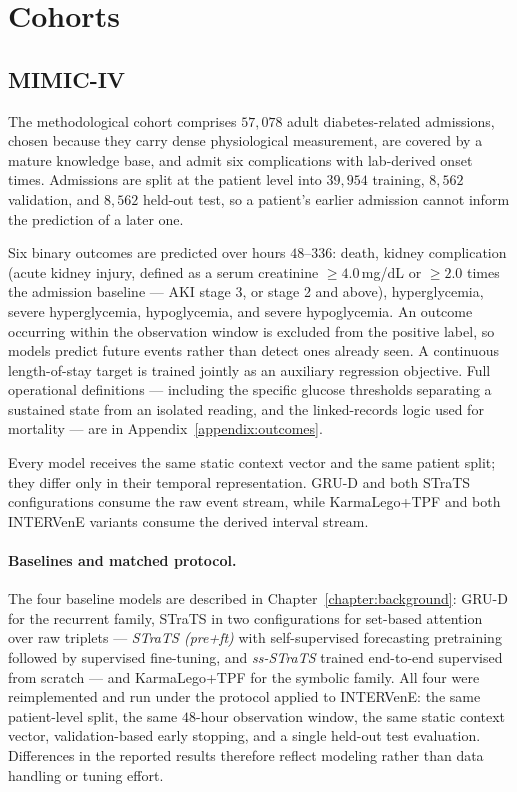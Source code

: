 \section{Cohorts}

\subsection{MIMIC-IV}
\label{sec:evalm-mimic-cohort}

The methodological cohort comprises $57{,}078$ adult diabetes-related admissions, chosen because they carry dense physiological measurement, are covered by a mature knowledge base, and admit six complications with lab-derived onset times. Admissions are split at the patient level into $39{,}954$ training, $8{,}562$ validation, and $8{,}562$ held-out test, so a patient's earlier admission cannot inform the prediction of a later one.

Six binary outcomes are predicted over hours $48$--$336$: death, kidney complication (acute kidney injury, defined as a serum creatinine $\ge 4.0$\,mg/dL or $\ge 2.0$ times the admission baseline --- AKI stage 3, or stage 2 and above), hyperglycemia, severe hyperglycemia, hypoglycemia, and severe hypoglycemia. An outcome occurring within the observation window is excluded from the positive label, so models predict future events rather than detect ones already seen. A continuous length-of-stay target is trained jointly as an auxiliary regression objective. Full operational definitions --- including the specific glucose thresholds separating a sustained state from an isolated reading, and the linked-records logic used for mortality --- are in Appendix~\ref{appendix:outcomes}.

Every model receives the same static context vector and the same patient split; they differ only in their temporal representation. GRU-D and both STraTS configurations consume the raw event stream, while KarmaLego+TPF and both INTERVenE variants consume the derived interval stream.

\paragraph{Baselines and matched protocol.}
The four baseline models are described in Chapter~\ref{chapter:background}: GRU-D \citep{che2018recurrent} for the recurrent family, STraTS \citep{tipirneni2022strats} in two configurations for set-based attention over raw triplets --- \emph{STraTS (pre+ft)} with self-supervised forecasting pretraining followed by supervised fine-tuning, and \emph{ss-STraTS} trained end-to-end supervised from scratch --- and KarmaLego+TPF \citep{moskovitch2015karmalego,sheetrit2019tpf} for the symbolic family. All four were reimplemented and run under the protocol applied to INTERVenE: the same patient-level split, the same $48$-hour observation window, the same static context vector, validation-based early stopping, and a single held-out test evaluation. Differences in the reported results therefore reflect modeling rather than data handling or tuning effort.

